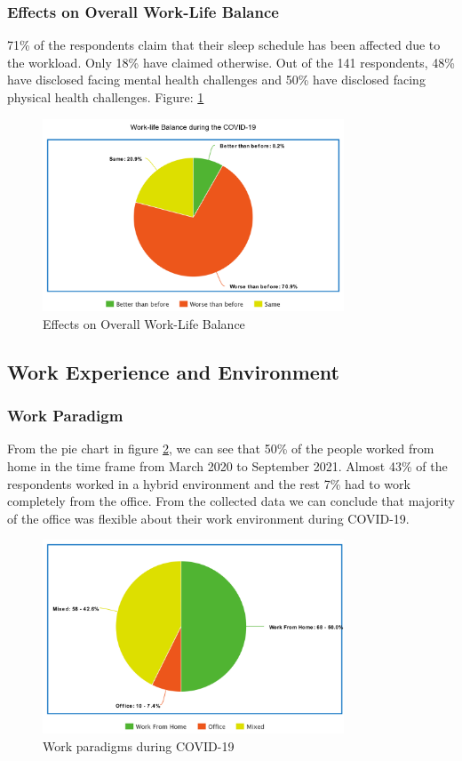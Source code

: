 \documentclass[11pt]{article}
\begin{document}
\subsubsection{Effects on Overall Work-Life Balance}
71\% of the respondents claim that their sleep schedule has been affected due to the workload. Only 18\% have claimed otherwise. Out of the 141 respondents, 48\% have disclosed facing mental health challenges and 50\% have disclosed facing physical health challenges. Figure: \ref{Effects on Overall Work-Life Balance}
\begin{figure}[!ht]
	\centering
	\includegraphics[width=0.8\textwidth]{Images/Work Life/Work Life Balance.png}
	\caption{Effects on Overall Work-Life Balance}
	\centering
	\label{Effects on Overall Work-Life Balance}
\end{figure}


\subsection {Work Experience and Environment}
\subsubsection{Work Paradigm}
From the pie chart in figure \ref{Work parad}, we can see that 50\% of the people worked from home in the time frame from March 2020 to September 2021. Almost 43\% of the respondents worked in a hybrid environment and the rest 7\% had to work completely from the office. From the collected data we can conclude that majority of the office was flexible about their work environment during COVID-19.
\newpage
\begin{figure}[!ht]
	\centering
	\includegraphics[width=0.8\textwidth]{Images/Experience/Work Paradigm.png}
	\caption{Work paradigms during COVID-19}
	\centering
	\label{Work parad}
\end{figure}
\end{document}
